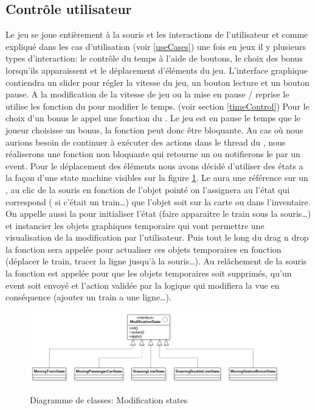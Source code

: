 \documentclass[report, backcover, french, nodocumentinfo]{upmethodology-document}
\begin{document}
			\subsection{Contrôle utilisateur}
				Le jeu se joue entièrement à la souris et les interactions de l'utilisateur et comme expliqué dans les cas d'utilisation (voir \ref{useCases}) une fois en jeux il y plusieurs types d'interaction: le contrôle du temps à l'aide de boutons, le choix des bonus lorsqu’ils apparaissent et le déplacement d'éléments du jeu.
					L'interface graphique contiendra un slider pour régler la vitesse du jeu, un bouton lecture et un bouton pause. A la modification de la vitesse de jeu ou la mise en pause / reprise le  utilise les fonction du  pour modifier le temps. (voir section \ref{timeControl})
					Pour le choix d'un bonus le  appel une fonction du . Le jeu est en pause le temps que le joueur choisisse un bonus, la fonction peut donc être bloquante. Au cas où nous aurions besoin de continuer à exécuter des actions dans le thread du , nous réaliserons une fonction non bloquante qui retourne un  ou notifierons le  par un event.
					Pour le déplacement des éléments nous avons décidé d'utiliser des états a la façon d'une state machine visibles sur la figure \ref{fig:ModificationStatesClassDiagram}. Le  aura une référence sur un , au clic de la souris en fonction de l'objet pointé on l'assignera au l'état qui correspond ( si c'était un train\ldots) que l'objet soit sur la carte ou dans l'inventaire. On appelle aussi la  pour initialiser l'état (faire apparaitre le train sous la souris\ldots) et instancier les objets graphiques temporaire qui vont permettre une visualisation de la modification par l'utilisateur. Puis tout le long du drag n drop la fonction  sera appelée pour actualiser ces objets temporaires en fonction (déplacer le train, tracer la ligne jusqu’à la souris\ldots). Au relâchement de la souris la fonction  est appelée pour que les objets temporaires soit supprimés, qu'un event soit envoyé et l'action validée par la logique qui modifiera la vue en conséquence (ajouter un train a une ligne\ldots).
					\begin{figure}[h!]
						\centering
						\includegraphics[width=\textwidth]{figures/ModificationStatesClassDiagram}
						\caption{Diagramme de classes: Modification states}
						\label{fig:ModificationStatesClassDiagram}
					\end{figure}
\end{document}

